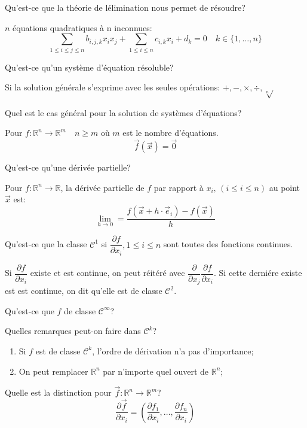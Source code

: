 \documentclass{amsart}
\begin{document}
Qu'est-ce que la th\'eorie de l\'elimination nous permet de r\'esoudre?

$n$ \'equations quadratiques \`a n inconnues:
\[ \sum_{1\leq i\leq j\leq n} b_{i,j,k}x_ix_j + \sum_{1\leq i\leq n} c_{i,k}x_i + d_k = 0 \quad k \in \{1,\dots,n\} \]

\vspace{10pt}
Qu'est-ce qu'un syst\`eme d'\'equation r\'esoluble?

Si la solution g\'en\'erale s'exprime avec les seules op\'erations: $+, -, \times, \div, \sqrt[n]{}$

\vspace{10pt}
Quel est le cas g\'en\'eral pour la solution de syst\`emes d'\'equations?

Pour $f \colon \mathbb R^n \to \mathbb R^m \quad n \geq m$ o\`u $m$ est le nombre d'\'equations.
\[ \vec f(\vec x) = \vec 0 \]

\vspace{10pt}
Qu'est-ce qu'une d\'eriv\'ee partielle?

Pour $f \colon \mathbb R^n \to \mathbb R$, la d\'eriv\'ee partielle de $f$ par rapport \`a $x_i,\,(i \leq i \leq n)$ au point $\vec x $ est:
\[ \lim_{h\to 0} = \frac{f(\vec x + h\cdot \vec e_i) - f(\vec x)}h \]

Qu'est-ce que la classe $\mathcal C^1$ si $\dfrac{\partial f}{\partial x_i}, 1 \leq i \leq n$ sont toutes des fonctions continues.

Si $\dfrac{\partial f}{\partial x_i}$ existe et est continue, on peut r\'eit\'er\'e avec $\dfrac{\partial}{\partial x_j}\dfrac{\partial f}{\partial x_i}$. Si cette derni\'ere
existe est est continue, on dit qu'elle est de classe $\mathcal C^2$.

\vspace{10pt}
Qu'est-ce que $f$ de classe $\mathcal C^\infty$?

\vspace{10pt}
Quelles remarques peut-on faire dans $\mathcal C^k$?
\begin{enumerate}
    \item Si $f$ est de classe $\mathcal C^k$, l'ordre de d\'erivation n'a pas d'importance;
    \item On peut remplacer $\mathbb R^n$ par n'importe quel ouvert de $\mathbb R^n$;
\end{enumerate}

\vspace{10pt}
Quelle est la distinction pour $\vec f \colon \mathbb R^n \to \mathbb R^m$?
\[ \frac{\partial \vec f}{\partial x_i} = \left( \frac{\partial f_1}{\partial x_i}, \dots, \frac{\partial f_n}{\partial x_i} \right) \]
\end{document}

